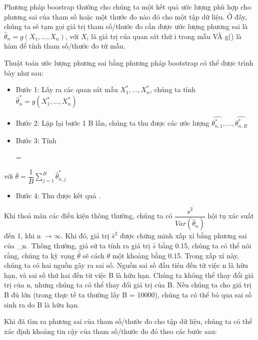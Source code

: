 \documentclass[
]{article}
\providecommand{\tightlist}{%
  \setlength{\itemsep}{0pt}\setlength{\parskip}{0pt}}
\begin{document}
Phương pháp boostrap thường cho chúng ta một kết quả ước lượng phù hợp cho phương sai của tham số hoặc một thước đo nào đó cho một tập dữ liệu. Ở đây, chúng ta sẽ tạm gọi giá trị tham số/thước đo cần được ước lượng phương sai là \(\hat{\theta}_n = g(X_1, ... , X_n)\), với \(X_i\) là giá trị của quan sát thứ i trong mẫu VÀ g() là hàm để tính tham số/thước đo từ mẫu.

Thuật toán ước lượng phương sai bằng phương pháp bootstrap có thể được trình bày như sau:

\begin{itemize}
\tightlist
\item
  Bước 1: Lấy ra các quan sát mẫu \(X_1^*, ... , X_n^*\), chúng ta tính \(\hat{\theta}_n^* = g(X_1^*, ... , X_n^*)\)
\item
  Bước 2: Lặp lại bước 1 B lần, chúng ta thu được các ước lượng \(\hat{\theta_{n,1}^*},...,\hat{\theta_{n,B}^*}\)
\item
  Bước 3: Tính

  \begin{center}
   = 
  \end{center}
\end{itemize}

với \(\bar{\theta} = \dfrac{1}{B} \sum\limits_{j = 1}^B \hat{\theta}_{n,j}^*\)

\begin{itemize}
\tightlist
\item
  Bước 4: Thu được kết quả .
\end{itemize}

Khi thoả mãn các điều kiện thông thường, chúng ta có \(\dfrac{s^2}{Var(\hat{\theta}_n)}\) hội tụ xác suất đến 1, khi n \(\rightarrow \infty\). Khi đó, giá trị \(\hat{s}^2\) được chứng minh xấp xỉ bằng phương sai của \hat{\theta}\_n.~Thông thường, giả sử ta tính ra giá trị \(\hat{s}\) bằng 0.15, chúng ta có thể nói rằng, chúng ta kỳ vọng \(\hat{\theta}\) sẽ cách \(\theta\) một khoảng bằng 0.15. Trong xấp xỉ này, chúng ta có hai nguồn gây ra sai số. Nguồn sai số đầu tiên đến từ việc n là hữu hạn, và sai số thứ hai đến từ việc B là hữu hạn. Chúng ta không thể thay đổi giá trị của n, nhưng chúng ta có thể thay đổi giá trị của B. Nếu chúng ta cho giá trị B đủ lớn (trong thực tế ta thường lấy B = 10000), chúng ta có thể bỏ qua sai số sinh ra do B là hữu hạn.

Khi đã tìm ra phương sai của tham số/thước đo cho tập dữ liệu, chúng ta có thể xác định khoảng tin cậy của tham số/thước đo đó theo các bước sau:
\end{document}
